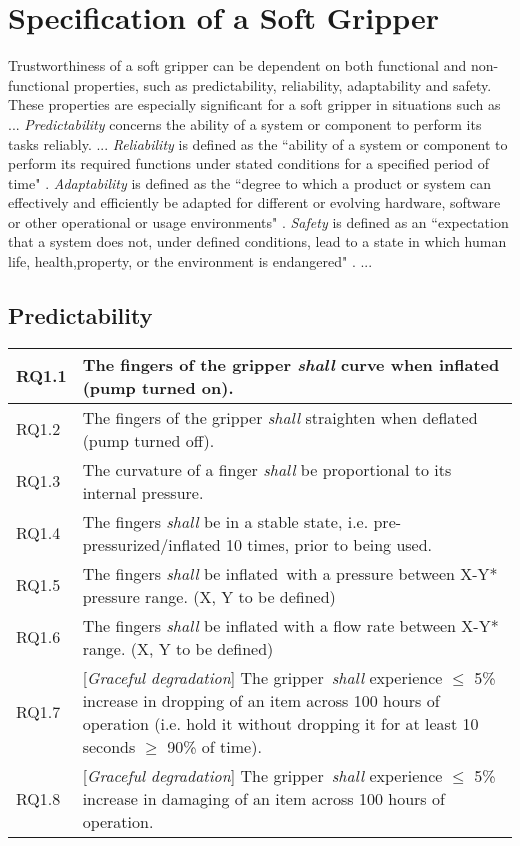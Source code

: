 \documentclass[lettersize,journal]{IEEEtran}
\begin{document}
\section{Specification of a Soft Gripper}\label{specification-gripper}
Trustworthiness of a soft gripper can be dependent on both functional and non-functional properties, such as predictability, reliability, adaptability and safety. 
These properties are especially significant for a soft gripper in situations such as ...
\emph{Predictability} concerns the ability of a system or component to perform its tasks reliably. ...
\emph{Reliability} is defined as the ``ability of a system or component to perform its required functions under stated conditions for a specified period of time" \cite{ISO24765:2017}. 
\emph{Adaptability} is defined as the ``degree to which a product or system can effectively and efficiently be adapted for different or evolving hardware, software or other operational or usage environments" \cite{ISO24765:2017}. 
\emph{Safety} is defined as an ``expectation that a system does not, under defined conditions, lead to a state in which human life, health,property, or the environment is endangered" \cite{ISO24765:2017}.
...

\subsection{Predictability}\label{predictability}
\begin{center}
	\begin{tabular}{|p{7mm}|p{72mm}|}
		\hline
		RQ1.1 & The fingers of the gripper \emph{shall} curve when inflated (pump turned on).  \\ 
		\hline
		RQ1.2 & The fingers of the gripper \emph{shall} straighten when deflated (pump turned off).  \\ 
		\hline
		RQ1.3 & The curvature of a finger \emph{shall} be proportional to its internal pressure. \\
		\hline
		RQ1.4 & The fingers \emph{shall} be in a stable state, i.e. pre-pressurized/inflated 10 times, prior to being used. \\ 
		\hline
		RQ1.5 & The fingers \emph{shall} be inflated with a pressure between X-Y* pressure range. (X, Y to be defined)\\
		\hline
		RQ1.6 & The fingers \emph{shall} be inflated with a flow rate between X-Y* range. (X, Y to be defined)\\	
		\hline
		RQ1.7 & [\emph{Graceful degradation}] The gripper \emph{shall} experience $\le$ 5\% increase in dropping of an item across 100 hours of operation (i.e. hold it without dropping it for at least 10 seconds $\ge$ 90\% of time). \\			\hline	
		RQ1.8 & [\emph{Graceful degradation}] The gripper \emph{shall} experience $\le$ 5\% increase in damaging of an item across 100 hours of operation.  \\		[1ex] 		
		\hline
	\end{tabular}
\end{center}
\end{document}
